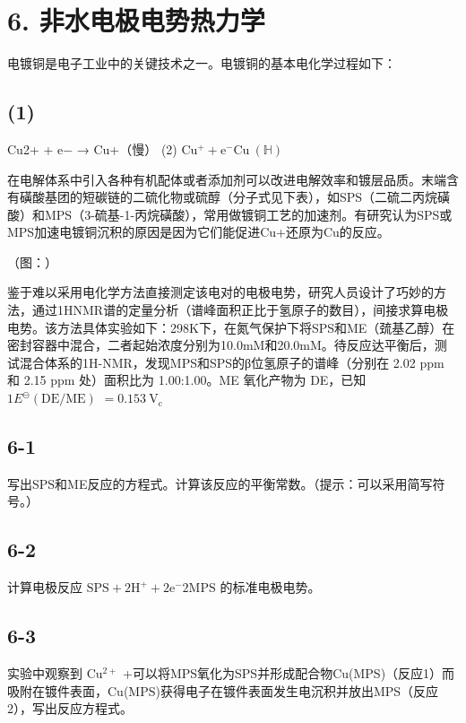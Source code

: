 \section*{6. 非水电极电势热力学}
电镀铜是电⼦⼯业中的关键技术之⼀。电镀铜的基本电化学过程如下：

\subsection*{(1)}
Cu2+ + e− → Cu+（慢） (2) $\mathrm { C u ^ { + } + e ^ { - }  C u \ ( \mathbb { H } ) }$

在电解体系中引⼊各种有机配体或者添加剂可以改进电解效率和镀层品质。末端含有磺酸基团的短碳链的⼆硫化物或硫醇（分⼦式⻅下表），如SPS（⼆硫⼆丙烷磺酸）和MPS（3-硫基-1-丙烷磺酸），常⽤做镀铜⼯艺的加速剂。有研究认为SPS或MPS加速电镀铜沉积的原因是因为它们能促进Cu+还原为Cu的反应。

（图：）

鉴于难以采⽤电化学⽅法直接测定该电对的电极电势，研究⼈员设计了巧妙的⽅法，通过1HNMR谱的定量分析（谱峰⾯积正⽐于氢原⼦的数⽬），间接求算电极电势。该⽅法具体实验如下：298K下，在氮⽓保护下将SPS和ME（巯基⼄醇）在密封容器中混合，⼆者起始浓度分别为10.0mM和20.0mM。待反应达平衡后，测试混合体系的1H-NMR，发现MPS和SPS的β位氢原⼦的谱峰（分别在 2.02 ppm 和 2.15 ppm 处）⾯积⽐为 1.00:1.00。ME 氧化产物为 DE，已知 $1 E ^ { \ominus } \mathrm { ( D E / M E ) }$ $= 0 . 1 5 3 ~ \mathrm { V _ { c } }$

\subsection*{6-1}
写出SPS和ME反应的⽅程式。计算该反应的平衡常数。（提⽰：可以采⽤简写符号。）

\subsection*{6-2}
计算电极反应 $\mathrm { S P S } + 2 \mathrm { H ^ { + } } + 2 \mathrm { e ^ { - } }  2 \mathrm { M P S }$ 的标准电极电势。

\subsection*{6-3}
实验中观察到 $\mathrm { C u ^ { 2 + } }$ +可以将MPS氧化为SPS并形成配合物Cu(MPS)（反应1）⽽吸附在镀件表⾯，Cu(MPS)获得电⼦在镀件表⾯发⽣电沉积并放出MPS（反应2），写出反应⽅程式。
